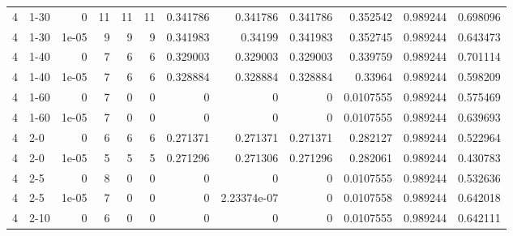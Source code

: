 \begin{tabular}{rlrrrrrrrrrr}
     4 & 1-30   &      0     &          11 &                11 &                11 &     0.341786    &     0.341786    &      0.341786    &        0.352542  &               0.989244 &           0.698096 \\
     4 & 1-30   &      1e-05 &           9 &                 9 &                 9 &     0.341983    &     0.34199     &      0.341983    &        0.352745  &               0.989244 &           0.643473 \\
     4 & 1-40   &      0     &           7 &                 6 &                 6 &     0.329003    &     0.329003    &      0.329003    &        0.339759  &               0.989244 &           0.701114 \\
     4 & 1-40   &      1e-05 &           7 &                 6 &                 6 &     0.328884    &     0.328884    &      0.328884    &        0.33964   &               0.989244 &           0.598209 \\
     4 & 1-60   &      0     &           7 &                 0 &                 0 &     0           &     0           &      0           &        0.0107555 &               0.989244 &           0.575469 \\
     4 & 1-60   &      1e-05 &           7 &                 0 &                 0 &     0           &     0           &      0           &        0.0107555 &               0.989244 &           0.639693 \\
     4 & 2-0    &      0     &           6 &                 6 &                 6 &     0.271371    &     0.271371    &      0.271371    &        0.282127  &               0.989244 &           0.522964 \\
     4 & 2-0    &      1e-05 &           5 &                 5 &                 5 &     0.271296    &     0.271306    &      0.271296    &        0.282061  &               0.989244 &           0.430783 \\
     4 & 2-5    &      0     &           8 &                 0 &                 0 &     0           &     0           &      0           &        0.0107555 &               0.989244 &           0.532636 \\
     4 & 2-5    &      1e-05 &           7 &                 0 &                 0 &     0           &     2.23374e-07 &      0           &        0.0107558 &               0.989244 &           0.642018 \\
     4 & 2-10   &      0     &           6 &                 0 &                 0 &     0           &     0           &      0           &        0.0107555 &               0.989244 &           0.642111 \\

\end{tabular}
